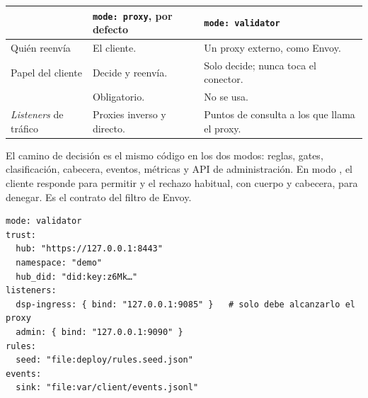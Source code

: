 \begin{center}
\end{center}

\noindent\begin{tabularx}{\linewidth}{@{}L{3.3cm}Y Y@{}}
\toprule
 & \textbf{\texttt{mode: proxy}}, por defecto & \textbf{\texttt{mode: validator}} \\
\midrule
Quién reenvía & El cliente. & Un proxy externo, como Envoy. \\
Papel del cliente & Decide y reenvía. & Solo decide; nunca toca el conector. \\
 & Obligatorio. & No se usa. \\
\emph{Listeners} de tráfico & Proxies inverso y directo. & Puntos de consulta a los que llama el proxy. \\
\bottomrule
\end{tabularx}

\medskip
El camino de decisión es el mismo código en los dos modos: reglas, gates, clasificación, cabecera, eventos,
métricas y API de administración. En modo , el cliente responde  para permitir y el
rechazo habitual, con cuerpo y cabecera, para denegar. Es el contrato del filtro  de Envoy.

\begin{lstlisting}[style=yaml]
mode: validator
trust:
  hub: "https://127.0.0.1:8443"
  namespace: "demo"
  hub_did: "did:key:z6Mk…"
listeners:
  dsp-ingress: { bind: "127.0.0.1:9085" }   # solo debe alcanzarlo el proxy
  admin: { bind: "127.0.0.1:9090" }
rules:
  seed: "file:deploy/rules.seed.json"
events:
  sink: "file:var/client/events.jsonl"
\end{lstlisting}

